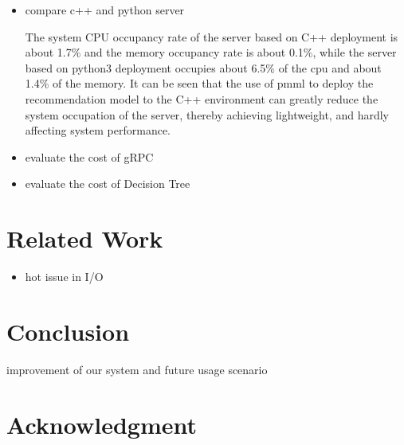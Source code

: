 \documentclass[conference]{IEEEtran}
\begin{document}
\begin{itemize}
	\item compare c++ and python server

\datatable



	The system CPU occupancy rate of the server based on C++ deployment is about 1.7\% and the memory occupancy rate is about 0.1\%, while the server based on python3 deployment occupies about 6.5\% of the cpu and about 1.4\% of the memory. It can be seen that the use of pmml to deploy the recommendation model to the C++ environment can greatly reduce the system occupation of the server, thereby achieving lightweight, and hardly affecting system performance.

	\item evaluate the cost of gRPC
	\item evaluate the cost of Decision Tree
\end{itemize}

\section{Related Work}
\begin{itemize}
	\item hot issue in I/O
\end{itemize}

\section{Conclusion}
improvement of our system and future usage scenario

\section*{Acknowledgment}
\end{document}
